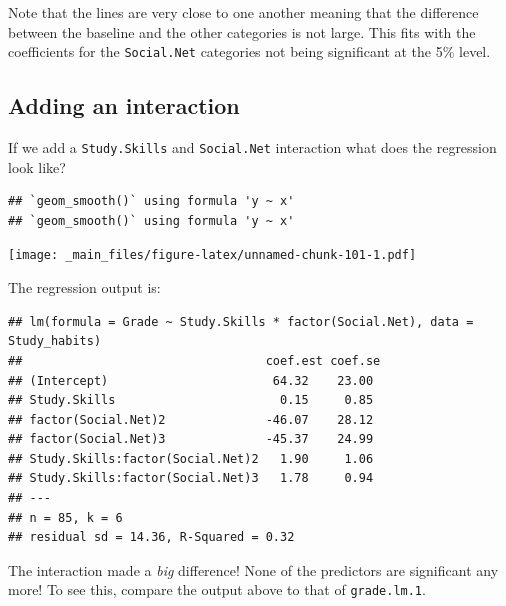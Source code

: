 \documentclass[
]{gitbook}
\begin{document}

Note that the lines are very close to one another meaning that the difference between the baseline and the other categories is not large. This fits with the coefficients for the \texttt{Social.Net} categories not being significant at the 5\% level.

\hypertarget{adding-an-interaction}{%
\subsection{Adding an interaction}\label{adding-an-interaction}}

If we add a \texttt{Study.Skills} and \texttt{Social.Net} interaction what does the regression look like?

\begin{verbatim}
## `geom_smooth()` using formula 'y ~ x'
## `geom_smooth()` using formula 'y ~ x'
\end{verbatim}

\texttt{[image: \_main\_files/figure-latex/unnamed-chunk-101-1.pdf]}

The regression output is:

\begin{verbatim}
## lm(formula = Grade ~ Study.Skills * factor(Social.Net), data = Study_habits)
##                                  coef.est coef.se
## (Intercept)                       64.32    23.00 
## Study.Skills                       0.15     0.85 
## factor(Social.Net)2              -46.07    28.12 
## factor(Social.Net)3              -45.37    24.99 
## Study.Skills:factor(Social.Net)2   1.90     1.06 
## Study.Skills:factor(Social.Net)3   1.78     0.94 
## ---
## n = 85, k = 6
## residual sd = 14.36, R-Squared = 0.32
\end{verbatim}


The interaction made a \emph{big} difference! None of the predictors are significant any more! To see this, compare the output above to that of \texttt{grade.lm.1}.
\end{document}
